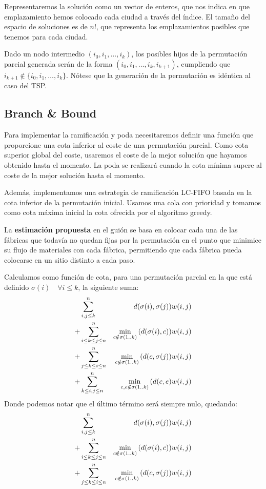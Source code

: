 \documentclass[a4paper, 11pt]{article} %
\begin{document}
      Representaremos la solución como un vector de enteros, que nos indica en que emplazamiento hemos colocado cada ciudad a 
      través del índice. El tamaño del espacio de soluciones es de $n!$, que representa los emplazamientos posibles que tenemos 
      para cada ciudad.
      
      Dado un nodo intermedio $(i_0,i_1,\dots,i_k)$, los posibles hijos de la permutación parcial generada serán
      de la forma $(i_0,i_1,\dots,i_k, i_{k+1})$, cumpliendo que $i_{k+1} \notin \{i_0,i_1,\dots,i_k\}$. Nótese
      que la generación de la permutación es idéntica al caso del TSP.
    
    \subsection{Branch \& Bound}
      Para implementar la ramificación y poda necesitaremos definir una función que proporcione una
      cota inferior al coste de una permutación parcial. Como cota superior global del coste, usaremos el
      coste de la mejor solución que hayamos obtenido hasta el momento. La poda se realizará cuando la cota
      mínima supere al coste de la mejor solución hasta el momento.
      
      Además, implementamos una estrategia de ramificación LC-FIFO basada en la cota inferior de la permutación
      inicial. Usamos una cola con prioridad y tomamos como cota máxima inicial la cota ofrecida por el algoritmo greedy.
      
      La \textbf{estimación propuesta} en el guión se basa en colocar cada una de las fábricas que todavía no
      quedan fijas por la permutación en el punto que minimice su flujo de materiales con cada fábrica,
      permitiendo que cada fábrica pueda colocarse en un sitio distinto a cada paso.
      
      Calculamos como función de cota, para una permutación parcial en la que está definido $\sigma(i) \quad \forall i \leq k$,
      la siguiente suma:
      \begin{eqnarray*}
      \displaystyle
	  & \sum_{i,j \leq k}^n & d(\sigma(i),\sigma(j)) w(i,j) \\
	+ & \sum_{i \leq k \leq j \leq n}^n & \min_{c \notin \sigma(1..k)}{(d(\sigma(i),c))} w(i,j) \\
	+ & \sum_{j \leq k \leq i \leq n}^n & \min_{c \notin \sigma(1..k)}{(d(c,\sigma(j))} w(i,j) \\
	+ & \sum_{k \leq i,j \leq n}^n& \min_{c,e \notin \sigma(1..k)}{(d(c,e)} w(i,j) \\
      \end{eqnarray*}
      Donde podemos notar que el último término será siempre nulo, quedando:
      \begin{eqnarray*}
      \displaystyle
	  & \sum_{i,j \leq k}^n & d(\sigma(i),\sigma(j)) w(i,j) \\
	+ & \sum_{i \leq k \leq j \leq n}^n & \min_{c \notin \sigma(1..k)}{(d(\sigma(i),c))} w(i,j) \\
	+ & \sum_{j \leq k \leq i \leq n}^n & \min_{c \notin \sigma(1..k)}{(d(c,\sigma(j))} w(i,j) \\
      \end{eqnarray*}
      \medskip
      
\end{document}
